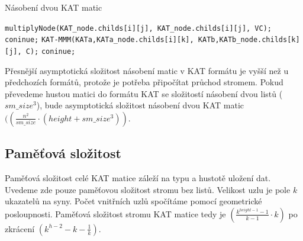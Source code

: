 \label{alg:kat-mmm}
\begin{algorithm}[htb]
	\caption{Násobení dvou KAT matic}\label{kat-mmm}
	\begin{algorithmic}[1]
							\State \texttt{multiplyNode(KAT\_node.childs[i][j], KAT\_node.childs[i][j], VC);}
							\State \texttt{coninue;}
						\EndIf
							\State \texttt{KAT-MMM(KATa,KATa\_node.childs[i][k], KATb,KATb\_node.childs[k][j], C);}
							\State \texttt{coninue;}
						\EndIf
					\EndIf
				\EndFor
			\EndFor
		\EndFor
		\EndProcedure
	\end{algorithmic}
\end{algorithm}

Přesnější asymptotická složitost násobení matic v KAT formátu je vyšší než u předchozích formátů, protože je potřeba připočítat průchod stromem. Pokud převedeme hustou matici do formátu KAT se složitostí násobení dvou listů \bigO($sm\_size^3$), bude asymptotická složitost násobení dvou KAT matic \bigO$((\frac{n^2}{sm\_size} \cdot (height+sm\_size^3))$.

\subsection{Paměťová složitost}

Paměťová složitost celé KAT matice záleží na typu a hustotě uložení dat. Uvedeme zde pouze paměťovou složitost stromu bez listů. Velikost uzlu je pole $k$ ukazatelů na syny. Počet vnitřních uzlů spočítáme pomocí geometrické posloupnosti. Paměťová složitost stromu KAT matice tedy je \bigO$(\frac{k^{height-1}-1}{k - 1} \cdot k)$ po zkrácení \bigO$(k^{h-2}-k-\frac{1}{k})$.